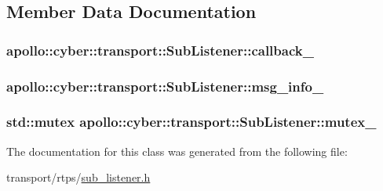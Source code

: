 \subsection{Member Data Documentation}
\hypertarget{classapollo_1_1cyber_1_1transport_1_1SubListener_a746c089299d8d41460212473548dc83c}{
\subsubsection[{callback\-\_\-}]{ apollo\-::cyber\-::transport\-::\-Sub\-Listener\-::callback\-\_\-\hspace{0.3cm}{\ttfamily [private]}}}\label{classapollo_1_1cyber_1_1transport_1_1SubListener_a746c089299d8d41460212473548dc83c}
\hypertarget{classapollo_1_1cyber_1_1transport_1_1SubListener_aef38d53df57590f133bdebbb55088f99}{
\subsubsection[{msg\-\_\-info\-\_\-}]{ apollo\-::cyber\-::transport\-::\-Sub\-Listener\-::msg\-\_\-info\-\_\-\hspace{0.3cm}{\ttfamily [private]}}}\label{classapollo_1_1cyber_1_1transport_1_1SubListener_aef38d53df57590f133bdebbb55088f99}
\hypertarget{classapollo_1_1cyber_1_1transport_1_1SubListener_af840084b22d5c95912836e1097f21ef6}{
\subsubsection[{mutex\-\_\-}]{\setlength{\rightskip}{0pt plus 5cm}std\-::mutex apollo\-::cyber\-::transport\-::\-Sub\-Listener\-::mutex\-\_\-\hspace{0.3cm}{\ttfamily [private]}}}\label{classapollo_1_1cyber_1_1transport_1_1SubListener_af840084b22d5c95912836e1097f21ef6}


The documentation for this class was generated from the following file\-:\begin{DoxyCompactItemize}
\item 
transport/rtps/\hyperlink{sub__listener_8h}{sub\-\_\-listener.\-h}\end{DoxyCompactItemize}
